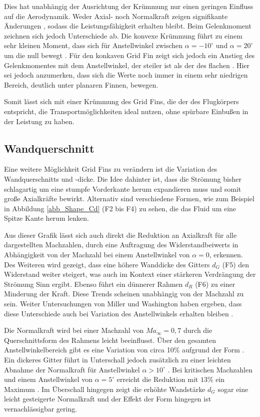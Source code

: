 Dies hat unabhängig der Ausrichtung der Krümmung nur einen geringen Einfluss auf die Aerodynamik. Weder Axial- noch Normalkraft zeigen signifikante Änderungen \cite{LambdaKonf}, sodass die Leistungsfähigkeit erhalten bleibt. Beim Gelenkmoment zeichnen sich jedoch Unterschiede ab. Die konvexe Krümmung führt zu einem sehr kleinen Moment, dass sich für Anstellwinkel zwischen $\alpha = -10^\circ$ und $\alpha=20^\circ$ um die null bewegt \cite{LambdaKonf}. Für den konkaven Grid Fin zeigt sich jedoch ein Anstieg des Gelenkmomentes mit dem Anstellwinkel, der steiler ist als der des flachen \cite{LambdaKonf}. Hier sei jedoch anzumerken, dass sich die Werte noch immer in einem sehr niedrigen Bereich, deutlich unter planaren Finnen, bewegen.

Somit lässt sich mit einer Krümmung des Grid Fins, die der des Flugkörpers entspricht, die Transportmöglichkeiten ideal nutzen, ohne spürbare Einbußen in der Leistung zu haben.
\subsection{Wandquerschnitt}
Eine weitere Möglichkeit Grid Fins zu verändern ist die Variation des Wandquerschnitts und -dicke. Die Idee dahinter ist, dass die Strömung bisher schlagartig um eine stumpfe Vorderkante herum expandieren muss und somit große Axialkräfte bewirkt. Alternativ sind verschiedene Formen, wie zum Beispiel in Abbildung \ref{abb_Shape_Cd} (F2 bis F4) zu sehen, die das Fluid um eine Spitze Kante herum lenken.

Aus dieser Grafik lässt sich auch direkt die Reduktion an Axialkraft für alle dargestellten Machzahlen, durch eine Auftragung des Widerstandbeiwerts in Abhängigkeit von der Machzahl bei einem Anstellwinkel von $\alpha=0$, erkennen. Des Weiteren wird gezeigt, dass eine höhere Wanddicke des Gitters $d_G$ (F5) den Widerstand weiter steigert, was auch im Kontext einer stärkeren Verdrängung der Strömung Sinn ergibt. Ebenso führt ein dünnerer Rahmen $d_R$ (F6) zu einer Minderung der Kraft. Diese Trends scheinen unabhängig von der Machzahl zu sein. Weiter Untersuchungen von Miller und Washington haben ergeben, dass diese Unterschiede auch bei Variation des Anstellwinkels erhalten bleiben \cite{Shape}.

Die Normalkraft wird bei einer Machzahl von $Ma_\infty=0,7$ durch die Querschnittsform des Rahmens leicht beeinflusst. Über den gesamten Anstellwinkelbereich gibt es eine Variation von circa 10\% aufgrund der Form \cite{Pattern}. Ein dickeres Gitter führt in Unterschall jedoch zusätzlich zu einer leichten Abnahme der Normalkraft für Anstellwinkel $\alpha>10^\circ$ \cite{Pattern}. Bei kritischen Machzahlen und einem Anstellwinkel von $\alpha=5^\circ$ erreicht die Reduktion mit $13\%$ ein Maximum \cite{Pattern}. Im Überschall hingegen zeigt die erhöhte Wandstärke $d_G$ sogar eine leicht gesteigerte Normalkraft und der Effekt der Form hingegen ist vernachlässigbar gering.

